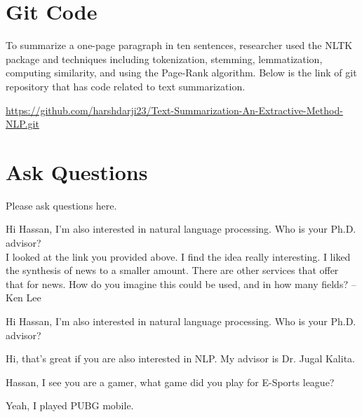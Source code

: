 \section{Git Code}
To summarize a one-page paragraph in ten sentences, researcher used the NLTK package and techniques including tokenization, stemming, lemmatization, computing similarity, and using the Page-Rank algorithm. Below is the link of git repository that has code related to text summarization.

\url{https://github.com/harshdarji23/Text-Summarization-An-Extractive-Method-NLP.git}

\section{Ask Questions}
Please ask questions here.

Hi Hassan, I'm also interested in natural language processing. Who is your Ph.D. advisor?\\
I looked at the link you provided above. I find the idea really interesting. I liked the synthesis of news to a smaller amount.  There are other services that offer that for news. How do you imagine this could be used, and in how many fields? -- Ken Lee 


Hi Hassan, I'm also interested in natural language processing. Who is your Ph.D. advisor?

Hi, that's great if you are also interested in NLP. My advisor is Dr. Jugal Kalita.

Hassan, I see you are a gamer, what game did you play for E-Sports league?

Yeah, I played PUBG mobile.

